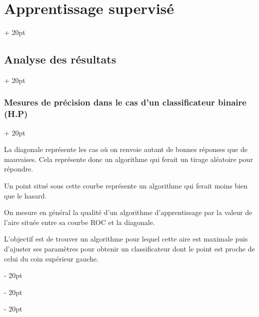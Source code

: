 \documentclass[a4paper, 12pt, twoside]{article}
\newcommand{\ind}[1][20pt]{\advance\leftskip + #1}
\newcommand{\deind}[1][20pt]{\advance\leftskip - #1}
\newenvironment{indt}[2][20pt]{#2 \par \ind[#1]}{\par \deind} %
\begin{document}
\begin{indt}{\section{Apprentissage supervisé}}
\begin{indt}{\subsection{Analyse des résultats}}
\begin{indt}{\subsubsection{Mesures de précision dans le cas d'un classificateur binaire (H.P)}}
\begin{center}
                \end{center}

                La diagonale représente les cas où on renvoie autant de bonnes réponses que de mauvaises.
                Cela représente donc un algorithme qui ferait un tirage aléatoire pour répondre.

                Un point situé sous cette courbe représente un algorithme qui ferait moins bien que le hasard.

                On mesure en général la qualité d'un algorithme d'apprentissage par la valeur de l'aire située entre sa courbe ROC et la  diagonale.

                L'objectif est de trouver un algorithme pour lequel cette aire est maximale puis d'ajuster ses paramètres pour obtenir un classificateur dont le point est proche de celui du coin supérieur gauche.
            \end{indt}
        \end{indt}
    \end{indt}
    
\end{document}
